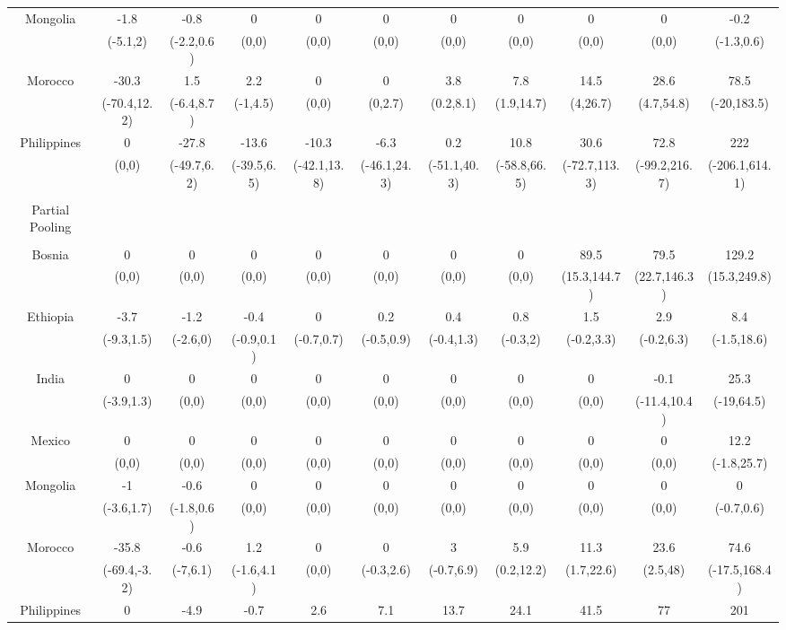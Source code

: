 \documentclass[english,12pt]{article}\usepackage{lmodern}
\numberwithin{equation}{section}
\begin{document}
\begin{landscape}
\begin{table}[!htbp]
\begin{tabular}{@{\extracolsep{5pt}} ccccccccccc}
 Mongolia & -1.8 & -0.8 & 0 & 0 & 0 & 0 & 0 & 0 & 0 & -0.2 \\
 & (-5.1,2) & (-2.2,0.6) & (0,0) & (0,0) & (0,0) & (0,0) & (0,0) & (0,0) & (0,0) & (-1.3,0.6) \\
 Morocco & -30.3 & 1.5 & 2.2 & 0 & 0 & 3.8 & 7.8 & 14.5 & 28.6 & 78.5 \\
 & (-70.4,12.2) & (-6.4,8.7) & (-1,4.5) & (0,0) & (0,2.7) & (0.2,8.1) & (1.9,14.7) & (4,26.7) & (4.7,54.8) & (-20,183.5) \\
 Philippines & 0 & -27.8 & -13.6 & -10.3 & -6.3 & 0.2 & 10.8 & 30.6 & 72.8 & 222 \\
& (0,0) & (-49.7,6.2) & (-39.5,6.5) & (-42.1,13.8) & (-46.1,24.3) & (-51.1,40.3) & (-58.8,66.5) & (-72.7,113.3) & (-99.2,216.7) & (-206.1,614.1) \\
\hline \\[-1.8ex]
Partial Pooling &&&&&&&&&& \\
\hline \\[-1.8ex]
 Bosnia & 0 & 0 & 0 & 0 & 0 & 0 & 0 & 89.5 & 79.5 & 129.2 \\
 & (0,0) & (0,0) & (0,0) & (0,0) & (0,0) & (0,0) & (0,0) & (15.3,144.7) & (22.7,146.3) & (15.3,249.8) \\
Ethiopia & -3.7 & -1.2 & -0.4 & 0 & 0.2 & 0.4 & 0.8 & 1.5 & 2.9 & 8.4 \\
& (-9.3,1.5) & (-2.6,0) & (-0.9,0.1) & (-0.7,0.7) & (-0.5,0.9) & (-0.4,1.3) & (-0.3,2) & (-0.2,3.3) & (-0.2,6.3) & (-1.5,18.6) \\
 India & 0 & 0 & 0 & 0 & 0 & 0 & 0 & 0 & -0.1 & 25.3 \\
& (-3.9,1.3) & (0,0) & (0,0) & (0,0) & (0,0) & (0,0) & (0,0) & (0,0) & (-11.4,10.4) & (-19,64.5) \\
 Mexico & 0 & 0 & 0 & 0 & 0 & 0 & 0 & 0 & 0 & 12.2 \\
 & (0,0) & (0,0) & (0,0) & (0,0) & (0,0) & (0,0) & (0,0) & (0,0) & (0,0) & (-1.8,25.7) \\
 Mongolia & -1 & -0.6 & 0 & 0 & 0 & 0 & 0 & 0 & 0 & 0 \\
& (-3.6,1.7) & (-1.8,0.6) & (0,0) & (0,0) & (0,0) & (0,0) & (0,0) & (0,0) & (0,0) & (-0.7,0.6) \\
Morocco & -35.8 & -0.6 & 1.2 & 0 & 0 & 3 & 5.9 & 11.3 & 23.6 & 74.6 \\
& (-69.4,-3.2) & (-7,6.1) & (-1.6,4.1) & (0,0) & (-0.3,2.6) & (-0.7,6.9) & (0.2,12.2) & (1.7,22.6) & (2.5,48) & (-17.5,168.4) \\
 Philippines & 0 & -4.9 & -0.7 & 2.6 & 7.1 & 13.7 & 24.1 & 41.5 & 77 & 201 \\

\end{tabular}
\end{table}
\end{landscape}
\end{document}
